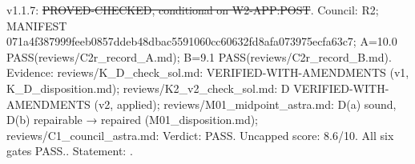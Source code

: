 \begin{corollary}\label{reg:W3-POST2_D}
\end{corollary}
\begin{statusbox}
 v1.1.7: \st{PROVED-CHECKED, conditional on W2-APP:POST}. Council: R2; MANIFEST 071a4f387999feeb0857ddeb48dbac5591060cc60632fd8afa073975ecfa63c7; A=10.0 PASS(reviews/C2r\_record\_A.md); B=9.1 PASS(reviews/C2r\_record\_B.md). Evidence: reviews/K\_D\_check\_sol.md: VERIFIED-WITH-AMENDMENTS (v1, K\_D\_disposition.md); reviews/K2\_v2\_check\_sol.md: D VERIFIED-WITH-AMENDMENTS (v2, applied); reviews/M01\_midpoint\_astra.md: D(a) sound, D(b) repairable → repaired (M01\_disposition.md); reviews/C1\_council\_astra.md: Verdict: PASS. Uncapped score: 8.6/10. All six gates PASS.. Statement: .
\end{statusbox}
